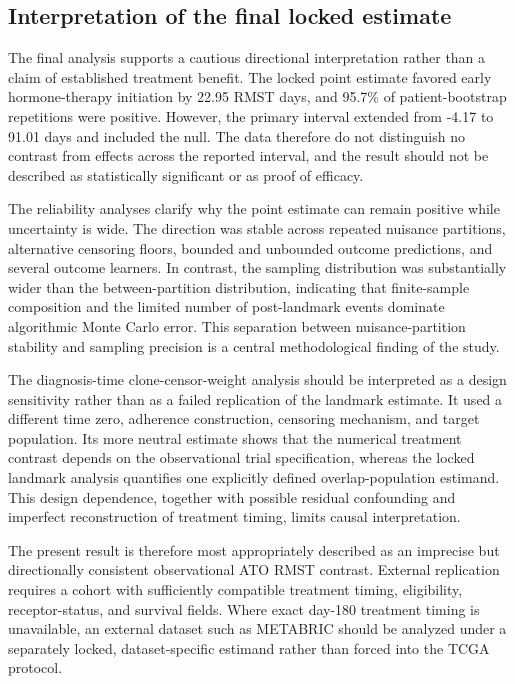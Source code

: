 \subsection{Interpretation of the final locked estimate}

The final analysis supports a cautious directional interpretation rather than a claim of established treatment benefit. The locked point estimate favored early hormone-therapy initiation by 22.95 RMST days, and 95.7\% of patient-bootstrap repetitions were positive. However, the primary interval extended from -4.17 to 91.01 days and included the null. The data therefore do not distinguish no contrast from effects across the reported interval, and the result should not be described as statistically significant or as proof of efficacy.

The reliability analyses clarify why the point estimate can remain positive while uncertainty is wide. The direction was stable across repeated nuisance partitions, alternative censoring floors, bounded and unbounded outcome predictions, and several outcome learners. In contrast, the sampling distribution was substantially wider than the between-partition distribution, indicating that finite-sample composition and the limited number of post-landmark events dominate algorithmic Monte Carlo error. This separation between nuisance-partition stability and sampling precision is a central methodological finding of the study.

The diagnosis-time clone-censor-weight analysis should be interpreted as a design sensitivity rather than as a failed replication of the landmark estimate. It used a different time zero, adherence construction, censoring mechanism, and target population. Its more neutral estimate shows that the numerical treatment contrast depends on the observational trial specification, whereas the locked landmark analysis quantifies one explicitly defined overlap-population estimand. This design dependence, together with possible residual confounding and imperfect reconstruction of treatment timing, limits causal interpretation.

The present result is therefore most appropriately described as an imprecise but directionally consistent observational ATO RMST contrast. External replication requires a cohort with sufficiently compatible treatment timing, eligibility, receptor-status, and survival fields. Where exact day-180 treatment timing is unavailable, an external dataset such as METABRIC should be analyzed under a separately locked, dataset-specific estimand rather than forced into the TCGA protocol.
